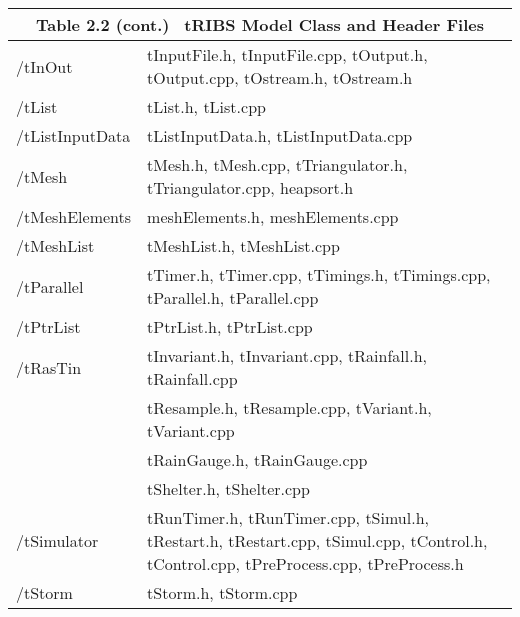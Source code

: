 \documentclass[12pt]{article}
\begin{document}
\begin{tabular}{p{3cm} p{10cm}}
\multicolumn{2}{c}{\textbf{ Table 2.2 (cont.)} \,  tRIBS Model Class and Header Files} \\ \hline
/tInOut   & tInputFile.h, tInputFile.cpp, tOutput.h, tOutput.cpp, tOstream.h, tOstream.h \\
/tList & tList.h, tList.cpp \\
/tListInputData & tListInputData.h, tListInputData.cpp \\
/tMesh & tMesh.h, tMesh.cpp, tTriangulator.h, tTriangulator.cpp, heapsort.h \\
/tMeshElements & meshElements.h, meshElements.cpp \\
/tMeshList & tMeshList.h, tMeshList.cpp \\
/tParallel & tTimer.h, tTimer.cpp, tTimings.h, tTimings.cpp, tParallel.h, tParallel.cpp \\
/tPtrList & tPtrList.h, tPtrList.cpp \\
/tRasTin & tInvariant.h, tInvariant.cpp, tRainfall.h, tRainfall.cpp \\
 & tResample.h, tResample.cpp, tVariant.h, tVariant.cpp \\
 & tRainGauge.h, tRainGauge.cpp \\
 & tShelter.h, tShelter.cpp \\
/tSimulator & tRunTimer.h, tRunTimer.cpp, tSimul.h, tRestart.h, tRestart.cpp, tSimul.cpp, tControl.h, tControl.cpp, tPreProcess.cpp, tPreProcess.h \\
/tStorm & tStorm.h, tStorm.cpp
\end{tabular}
\end{document}
